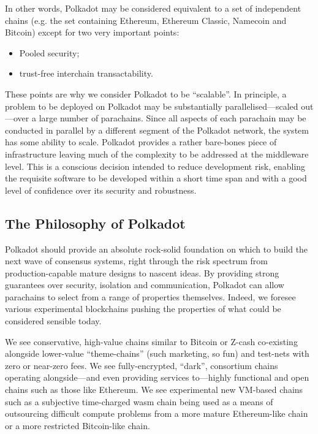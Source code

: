 \documentclass[9pt,oneside]{amsart}
\makeatletter
\providecommand{\tightlist}{%
  \setlength{\itemsep}{0pt}\setlength{\parskip}{0pt}}
\newcommand*\eg{e.g.\@\xspace}
\makeatother
\begin{document}
\begin{multicols}{2}
 In other words, Polkadot may be considered equivalent to a set of independent chains (\eg the set containing Ethereum, Ethereum Classic, Namecoin and Bitcoin) except for two very important points:

\begin{itemize}
\tightlist
\item Pooled security;
\item trust-free interchain transactability.
\end{itemize}

 These points are why we consider Polkadot to be ``scalable''. In principle, a problem to be deployed on Polkadot may be substantially parallelised---scaled out---over a large number of parachains. Since all aspects of each parachain may be conducted in parallel by a different segment of the Polkadot network, the system has some ability to scale. Polkadot provides a rather bare-bones piece of infrastructure leaving much of the complexity to be addressed at the middleware level. This is a conscious decision intended to reduce development risk, enabling the requisite software to be developed within a short time span and with a good level of confidence over its security and robustness.

\subsection{The Philosophy of Polkadot}\label{the-philosophy-of-disparity}

 Polkadot should provide an absolute rock-solid foundation on which to build the next wave of consensus systems, right through the risk spectrum from production-capable mature designs to nascent ideas. By providing strong guarantees over security, isolation and communication, Polkadot can allow parachains to select from a range of properties themselves. Indeed, we foresee various experimental blockchains pushing the properties of what could be considered sensible today.

We see conservative, high-value chains similar to Bitcoin or Z-cash\cite{sasson2014zerocash}
 co-existing alongside lower-value ``theme-chains'' (such marketing, so fun) and test-nets with zero or near-zero fees. We see fully-encrypted, ``dark'', consortium chains operating alongside---and even providing services to---highly functional and open chains such as those like Ethereum. We see experimental new VM-based chains such as a subjective time-charged wasm chain being used as a means of outsourcing difficult compute problems from a more mature Ethereum-like chain or a more restricted Bitcoin-like chain.


\end{multicols}
\end{document}
